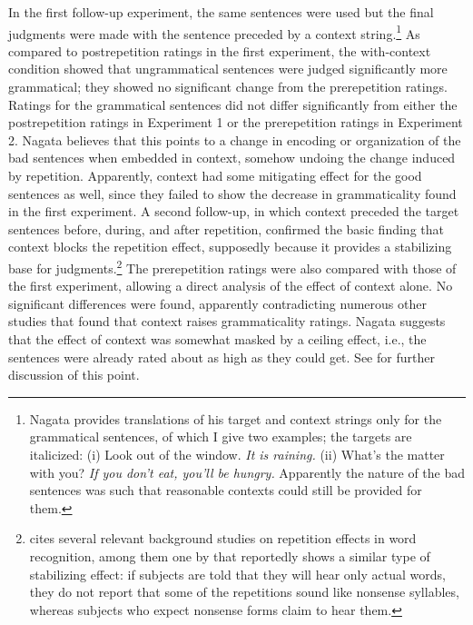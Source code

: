In the first follow-up experiment, the same sentences were used but the final judgments were made with the sentence preceded by a context string.\footnote{Nagata provides translations of his target and context strings only for the grammatical sentences, of which I give two examples; the targets are italicized: (i) Look out of the window. \textit{It is raining.} (ii) What's the matter with you? \textit{If you don't eat, you'll be hungry.} Apparently the nature of the bad sentences was such that reasonable contexts could still be provided for them.}
 As compared to postrepetition ratings in the first experiment, the with-context condition showed that ungrammatical sentences were judged significantly more grammatical; they showed no significant change from the prerepetition ratings. Ratings for the grammatical sentences did not differ significantly from either the postrepetition ratings in Experiment 1 or the prerepetition ratings in Experiment 2. Nagata believes that this points to a change in encoding or organization of the bad sentences when embedded in context, somehow undoing the change induced by repetition. Apparently, context had some mitigating effect for the good sentences as well, since they failed to show the decrease in grammaticality found in the first experiment. A second follow-up, in which context preceded the target sentences before, during, and after repetition, confirmed the basic finding that context blocks the repetition effect, supposedly because it provides a stabilizing base for judgments.\footnote{\citet{Spencer1973} cites several relevant background studies on repetition effects in word recognition, among them one by \citet{TaylorEtAl1963} that reportedly shows a similar type of stabilizing effect: if subjects are told that they will hear only actual words, they do not report that some of the repetitions sound like nonsense syllables, whereas subjects who expect nonsense forms claim to hear them.}
The prerepetition ratings were also compared with those of the first experiment, allowing a direct analysis of the effect of context alone. No significant
differences were found, apparently contradicting numerous other studies that found that context raises grammaticality ratings. Nagata  suggests that the effect of context was somewhat masked by a ceiling effect, i.e., the sentences were already rated about as high as they could get. See  for further discussion of this point.

